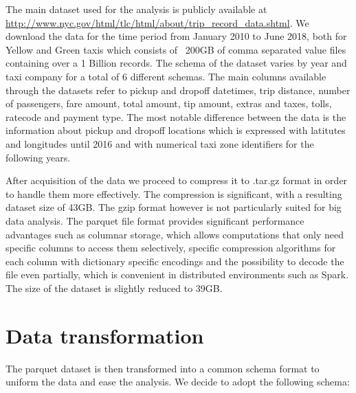 \documentclass{acm_proc_article-sp-sigmod09}
\begin{document}
The main dataset used for the analysis is publicly available at \url{http://www.nyc.gov/html/tlc/html/about/trip_record_data.shtml}. We download the data for the time period from January 2010 to June 2018, both for Yellow and Green taxis which consists of ~200GB of comma separated value files containing over a 1 Billion records. The schema of the dataset varies by year and taxi company for a total of 6 different schemas. The main columns available through the datasets refer to pickup and dropoff datetimes, trip distance, number of passengers, fare amount, total amount, tip amount, extras and taxes, tolls, ratecode and payment type. The most notable difference between the data is the information about pickup and dropoff locations which is expressed with latitutes and longitudes until 2016 and with numerical taxi zone identifiers for the following years.

After acquisition of the data we proceed to compress it to .tar.gz format in order to handle them more effectively. The compression is significant, with a resulting dataset size of 43GB. The gzip format however is not particularly suited for big data analysis. The parquet file format provides significant performance advantages such as columnar storage, which allows computations that only need specific columns to access them selectively, specific compression algorithms for each column with dictionary specific encodings and the possibility to decode the file even partially, which is convenient in distributed environments such as Spark. The size of the dataset is slightly reduced to 39GB.

\section{Data transformation}

The parquet dataset is then transformed into a common schema format to uniform the data and ease the analysis. We decide to adopt the following schema:
\end{document}
